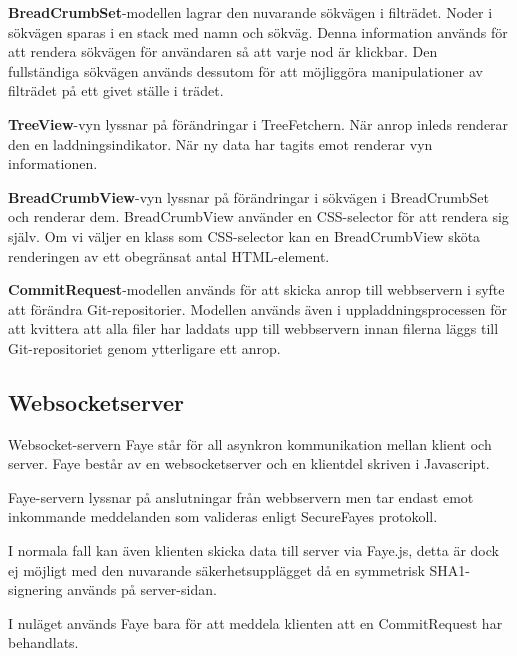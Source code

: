 {\bf BreadCrumbSet}-modellen lagrar den nuvarande sökvägen i filträdet. Noder i sökvägen sparas i en stack med namn och sökväg. Denna information används för att rendera sökvägen för användaren så att varje nod är klickbar. Den fullständiga sökvägen används dessutom för att möjliggöra manipulationer av filträdet på ett givet ställe i trädet.

{\bf TreeView}-vyn lyssnar på förändringar i TreeFetchern. När anrop inleds renderar den en laddningsindikator. När ny data har tagits emot renderar vyn informationen.

{\bf BreadCrumbView}-vyn lyssnar på förändringar i sökvägen i BreadCrumbSet och renderar dem. BreadCrumbView använder en CSS-selector för att rendera sig själv. Om vi väljer en klass som CSS-selector kan en BreadCrumbView sköta renderingen av ett obegränsat antal HTML-element.

{\bf CommitRequest}-modellen används för att skicka anrop till webbservern i syfte att förändra Git-repositorier. Modellen används även i uppladdningsprocessen för att kvittera att alla filer har laddats upp till webbservern innan filerna läggs till Git-repositoriet genom ytterligare ett anrop.

\subsection{Websocketserver}
Websocket-servern Faye står för all asynkron kommunikation mellan klient och server. Faye består av en websocketserver och en klientdel skriven i Javascript.

Faye-servern lyssnar på anslutningar från webbservern men tar endast emot inkommande meddelanden som valideras enligt SecureFayes protokoll.

I normala fall kan även klienten skicka data till server via Faye.js, detta är dock ej möjligt med den nuvarande säkerhetsupplägget då en symmetrisk SHA1-signering används på server-sidan.

I nuläget används Faye bara för att meddela klienten att en CommitRequest har behandlats.

